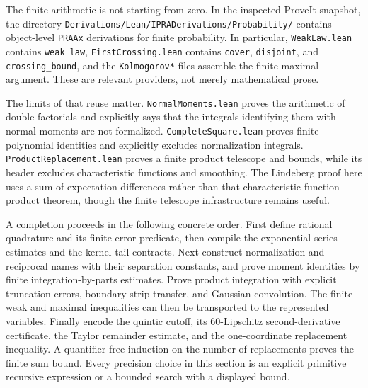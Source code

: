 The finite arithmetic is not starting from zero.  In the inspected ProveIt
snapshot, the directory
\texttt{Derivations/Lean/IPRADerivations/Probability/} contains object-level
\texttt{PRAAx} derivations for finite probability.  In particular,
\texttt{WeakLaw.lean} contains \texttt{weak\_law},
\texttt{FirstCrossing.lean} contains \texttt{cover}, \texttt{disjoint}, and
\texttt{crossing\_bound}, and the \texttt{Kolmogorov*} files assemble the
finite maximal argument.  These are relevant providers, not merely
mathematical prose.

The limits of that reuse matter.  \texttt{NormalMoments.lean} proves the
arithmetic of double factorials and explicitly says that the integrals
identifying them with normal moments are not formalized.
\texttt{CompleteSquare.lean} proves finite polynomial identities and
explicitly excludes normalization integrals.  \texttt{ProductReplacement.lean}
proves a finite product telescope and bounds, while its header excludes
characteristic functions and smoothing.  The Lindeberg proof here uses a
sum of expectation differences rather than that characteristic-function
product theorem, though the finite telescope infrastructure remains useful.

A completion proceeds in the following concrete order.  First define
rational quadrature and its finite error predicate, then compile the
exponential series estimates and the kernel-tail contracts.  Next construct
normalization and reciprocal names with their separation constants, and
prove moment identities by finite integration-by-parts estimates.  Prove
product integration with explicit truncation errors, boundary-strip transfer,
and Gaussian convolution.  The finite weak and maximal inequalities can
then be transported to the represented variables.  Finally encode the
quintic cutoff, its $60$-Lipschitz second-derivative certificate, the Taylor
remainder estimate, and the one-coordinate replacement inequality.  A
quantifier-free induction on the number of replacements proves the finite
sum bound.  Every precision choice in this section is an explicit primitive
recursive expression or a bounded search with a displayed bound.

